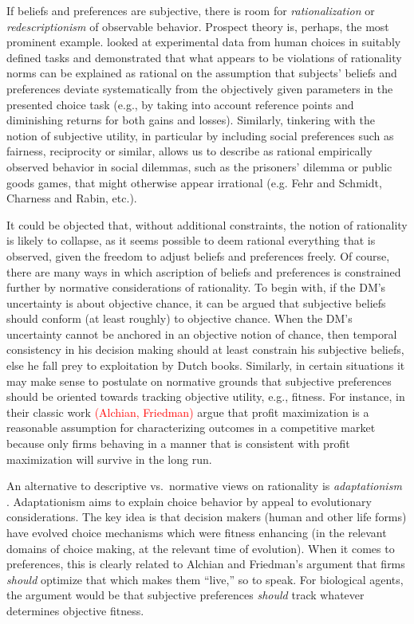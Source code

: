 \documentclass[fleqn,reqno,11pt]{article}
\newcommand{\myalert}[1]{\textcolor{red}{#1}}
\begin{document}
If beliefs and preferences are subjective, there is room for \emph{rationalization} or
\emph{redescriptionism} of observable behavior. Prospect theory is, perhaps, the most prominent
example. \citet{KahnemannTversky1979:Prospect-Theory} looked at experimental data from human
choices in suitably defined tasks and demonstrated that what appears to be violations of
rationality norms can be explained as rational on the assumption that subjects' beliefs and
preferences deviate systematically from the objectively given parameters in the presented
choice task (e.g., by taking into account reference points and diminishing returns for both
gains and losses).  Similarly, tinkering with the notion of subjective utility, in particular
by including social preferences such as fairness, reciprocity or similar, allows us to describe
as rational empirically observed behavior in social dilemmas, such as the prisoners' dilemma or
public goods games, that might otherwise appear irrational (e.g. Fehr and Schmidt, Charness and
Rabin, etc.).

It could be objected that, without additional constraints, the notion of rationality is likely
to collapse, as it seems possible to deem rational everything that is observed, given the
freedom to adjust beliefs and preferences freely. Of course, there are many ways in which
ascription of beliefs and preferences is constrained further by normative considerations of
rationality. To begin with, if the DM's uncertainty is about objective chance, it can be argued
that subjective beliefs should conform (at least roughly) to objective chance. When the DM's
uncertainty cannot be anchored in an objective notion of chance, then temporal consistency in
his decision making should at least constrain his subjective beliefs, else he fall prey to
exploitation by Dutch books. Similarly, in certain situations it may make sense to postulate on
normative grounds that subjective preferences should be oriented towards tracking objective
utility, e.g., fitness. For instance, in their classic work \myalert{(Alchian, Friedman)} argue
that profit maximization is a reasonable assumption for characterizing outcomes in a
competitive market because only firms behaving in a manner that is consistent with profit
maximization will survive in the long run.

An alternative to descriptive vs.~normative views on rationality is \emph{adaptationism}
\citep[e.g.][]{HagenChater2012:Decision-Making}.  Adaptationism aims to
explain choice behavior by appeal to evolutionary considerations. The key idea is that decision
makers (human and other life forms) have evolved choice mechanisms which were fitness enhancing
(in the relevant domains of choice making, at the relevant time of evolution). When it comes to
preferences, this is clearly related to Alchian and Friedman's argument that firms
\emph{should} optimize that which makes them ``live,'' so to speak. For biological agents, the
argument would be that subjective preferences \emph{should} track whatever determines objective
fitness.
\end{document}
